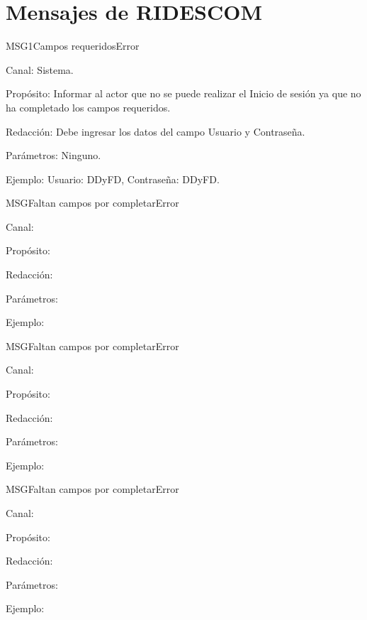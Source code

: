 \section{Mensajes de RIDESCOM}


\begin{mensaje}{MSG1}{Campos requeridos}{Error}
	\item[Canal:] Sistema.
    \item[Propósito:] Informar al actor que no se puede realizar el Inicio de sesión ya que no ha completado los campos requeridos.
    \item[Redacción:] Debe ingresar los datos del campo Usuario y Contraseña.
    \item[Parámetros:] Ninguno.
    \item[Ejemplo:] Usuario: DDyFD, Contraseña: DDyFD.
\end{mensaje}



\begin{mensaje}{MSG}{Faltan campos por completar}{Error}
	\item[Canal:] 
	\item[Propósito:] 
	\item[Redacción:] 
	\item[Parámetros:] 
	\item[Ejemplo:] 
\end{mensaje}



\begin{mensaje}{MSG}{Faltan campos por completar}{Error}
	\item[Canal:] 
	\item[Propósito:] 
	\item[Redacción:] 
	\item[Parámetros:] 
	\item[Ejemplo:] 
\end{mensaje}



\begin{mensaje}{MSG}{Faltan campos por completar}{Error}
	
	\item[Canal:] 
	
	\item[Propósito:] 
	
	\item[Redacción:] 
	
	\item[Parámetros:] 
	
	\item[Ejemplo:] 
	
\end{mensaje}